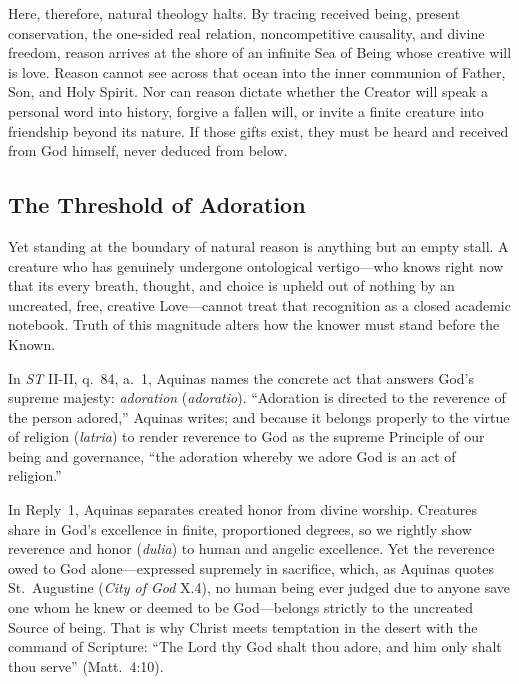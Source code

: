 Here, therefore, natural theology halts. By tracing received being, present conservation, the one-sided real relation, noncompetitive causality, and divine freedom, reason arrives at the shore of an infinite Sea of Being whose creative will is love. Reason cannot see across that ocean into the inner communion of Father, Son, and Holy Spirit. Nor can reason dictate whether the Creator will speak a personal word into history, forgive a fallen will, or invite a finite creature into friendship beyond its nature. If those gifts exist, they must be heard and received from God himself, never deduced from below.

\subsection{The Threshold of Adoration}

Yet standing at the boundary of natural reason is anything but an empty stall. A creature who has genuinely undergone ontological vertigo---who knows right now that its every breath, thought, and choice is upheld out of nothing by an uncreated, free, creative Love---cannot treat that recognition as a closed academic notebook. Truth of this magnitude alters how the knower must stand before the Known.

In \emph{ST} II-II, q.\ 84, a.\ 1, Aquinas names the concrete act that answers God's supreme majesty: \emph{adoration} (\emph{adoratio}). ``Adoration is directed to the reverence of the person adored,'' Aquinas writes; and because it belongs properly to the virtue of religion (\emph{latria}) to render reverence to God as the supreme Principle of our being and governance, ``the adoration whereby we adore God is an act of religion.''

In Reply~1, Aquinas separates created honor from divine worship. Creatures share in God's excellence in finite, proportioned degrees, so we rightly show reverence and honor (\emph{dulia}) to human and angelic excellence. Yet the reverence owed to God alone---expressed supremely in sacrifice, which, as Aquinas quotes St.\ Augustine (\emph{City of God} X.4), no human being ever judged due to anyone save one whom he knew or deemed to be God---belongs strictly to the uncreated Source of being. That is why Christ meets temptation in the desert with the command of Scripture: ``The Lord thy God shalt thou adore, and him only shalt thou serve'' (Matt.\ 4:10).

